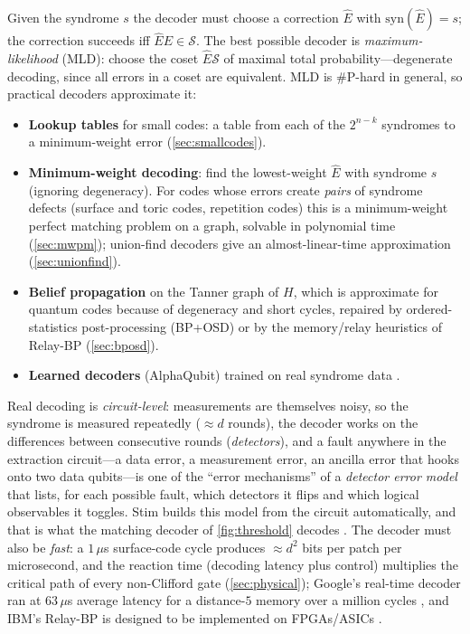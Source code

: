 Given the syndrome $s$ the decoder must choose a correction $\hat E$ with $\mathrm{syn}(\hat E)=s$; the correction succeeds iff $\hat E E\in\mathcal S$. The best possible decoder is \emph{maximum-likelihood} (MLD): choose the coset $\hat E\mathcal S$ of maximal total probability---degenerate decoding, since all errors in a coset are equivalent. MLD is \#P-hard in general, so practical decoders approximate it:
\begin{itemize}[leftmargin=*]
\item \textbf{Lookup tables} for small codes: a table from each of the $2^{n-k}$ syndromes to a minimum-weight error (\cref{sec:smallcodes}).
\item \textbf{Minimum-weight decoding}: find the lowest-weight $\hat E$ with syndrome $s$ (ignoring degeneracy). For codes whose errors create \emph{pairs} of syndrome defects (surface and toric codes, repetition codes) this is a minimum-weight perfect matching problem on a graph, solvable in polynomial time (\cref{sec:mwpm}); union-find decoders give an almost-linear-time approximation (\cref{sec:unionfind}).
\item \textbf{Belief propagation} on the Tanner graph of $H$, which is approximate for quantum codes because of degeneracy and short cycles, repaired by ordered-statistics post-processing (BP+OSD) or by the memory/relay heuristics of Relay-BP (\cref{sec:bposd}).
\item \textbf{Learned decoders} (AlphaQubit) trained on real syndrome data \cite{alphaqubit24}.
\end{itemize}
Real decoding is \emph{circuit-level}: measurements are themselves noisy, so the syndrome is measured repeatedly ($\approx d$ rounds), the decoder works on the differences between consecutive rounds (\emph{detectors}), and a fault anywhere in the extraction circuit---a data error, a measurement error, an ancilla error that hooks onto two data qubits---is one of the ``error mechanisms'' of a \emph{detector error model} that lists, for each possible fault, which detectors it flips and which logical observables it toggles. Stim builds this model from the circuit automatically, and that is what the matching decoder of \cref{fig:threshold} decodes \cite{gidney21stim,higgott23pymatching}. The decoder must also be \emph{fast}: a $1\,\mu$s surface-code cycle produces $\approx d^2$ bits per patch per microsecond, and the reaction time (decoding latency plus control) multiplies the critical path of every non-Clifford gate (\cref{sec:physical}); Google's real-time decoder ran at $63\,\mu$s average latency for a distance-$5$ memory over a million cycles \cite{willow25}, and IBM's Relay-BP is designed to be implemented on FPGAs/ASICs \cite{mueller25relaybp}.

